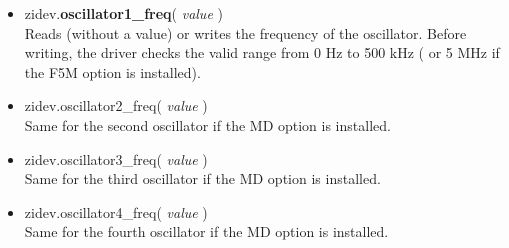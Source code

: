 \documentclass[11pt]{article} %
\begin{document}
\begin{itemize}
\item zidev.{\bf oscillator1\_freq}( {\it value} ) \\
	Reads (without a value) or writes the frequency of the oscillator. Before writing, the driver checks the valid range from 0 Hz to 500 kHz ( or 5 MHz if the F5M option is installed).
\item zidev.oscillator2\_freq( {\it value} ) \\
	Same for the second oscillator if the MD option is installed.
\item zidev.oscillator3\_freq( {\it value} ) \\
	Same for the third oscillator if the MD option is installed.
\item zidev.oscillator4\_freq( {\it value} ) \\
	Same for the fourth oscillator if the MD option is installed.


\end{itemize}
\end{document}
